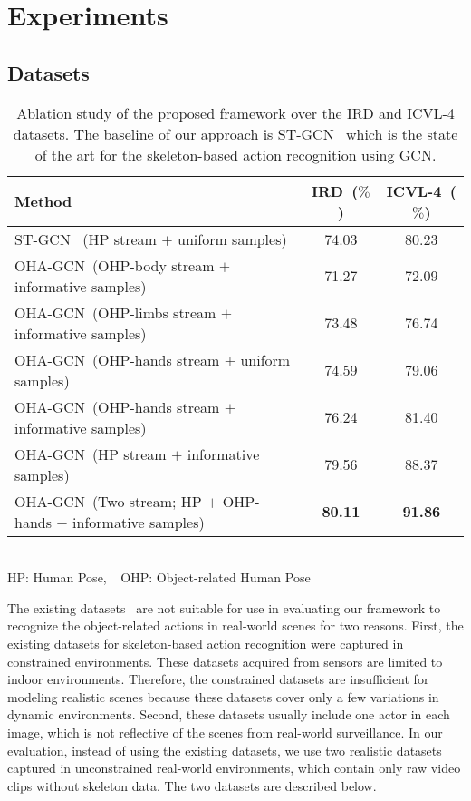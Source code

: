 \documentclass[10pt,twocolumn,letterpaper]{article}
\begin{document}
\section{Experiments}

\subsection{Datasets}

\begin{table*}[t]\centering
\caption{Ablation study of the proposed framework over the IRD and ICVL-4 datasets. The baseline of our approach is ST-GCN~\cite{stgcn2018aaai} which is the state of the art for the skeleton-based action recognition using GCN.} 
\vspace{3mm}
\centering
\begin{tabular}{p{10.5cm}|cc} 

\hline
Method & IRD~($\%$) & ICVL-4~($\%$)   \\\hline
ST-GCN~\cite{stgcn2018aaai} (HP stream $+$ uniform samples) & 74.03 & 80.23   \\ \hline
OHA-GCN~(OHP-body stream $+$ informative samples) & 71.27  & 72.09   \\ 
OHA-GCN~(OHP-limbs stream $+$ informative samples) &  73.48 & 76.74  \\ 
OHA-GCN~(OHP-hands stream $+$ uniform samples) & 74.59  & 79.06  \\ 
OHA-GCN~(OHP-hands stream $+$ informative samples) &  76.24 & 81.40  \\ 
OHA-GCN~(HP stream $+$ informative samples) & 79.56 & 88.37  \\
 \hline 
OHA-GCN~(Two stream; HP $+$ OHP-hands $+$ informative samples) & \textbf{80.11} & \textbf{91.86}   \\ 
\hline
\end{tabular}
\\{HP: Human Pose, $~~$ OHP: Object-related Human Pose}
\label{tabular:all_res}
\end{table*}


The existing datasets~\cite{hu2015jointly,shahroudy2016ntu,xia2012view} are not suitable for use in evaluating our framework to recognize the object-related actions in real-world scenes for two reasons.
First, the existing datasets for skeleton-based action recognition were captured in constrained environments.
These datasets acquired from sensors are limited to indoor environments.
Therefore, the constrained datasets are insufficient for modeling realistic scenes because these datasets cover only a few variations in dynamic environments.
Second, these datasets usually include one actor in each image, which is not reflective of the scenes from real-world surveillance.
In our evaluation, instead of using the existing datasets, we use two realistic datasets captured in unconstrained real-world environments, which contain only raw video clips without skeleton data. The two datasets are described below.
\end{document}
